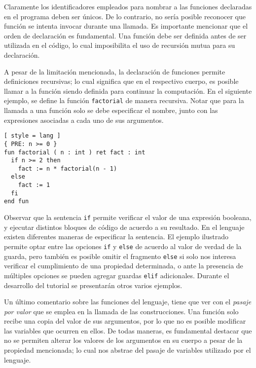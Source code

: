 Claramente los identificadores empleados para nombrar a las funciones declaradas en el programa deben ser únicos.
De lo contrario, no sería posible reconocer que función se intenta invocar durante una llamada.
Es importante mencionar que el orden de declaración es fundamental.
Una función debe ser definida antes de ser utilizada en el código, lo cual imposibilita el uso de recursión mutua para su declaración.

A pesar de la limitación mencionada, la declaración de funciones permite definiciones recursivas; lo cual significa que en el respectivo cuerpo, es posible llamar a la función siendo definida para continuar la computación.
En el siguiente ejemplo, se define la función \lstinline[style = lang]{factorial} de manera recursiva.
Notar que para la llamada a una función solo se debe especificar el nombre, junto con las expresiones asociadas a cada uno de sus argumentos.

\begin{lstlisting}[ style = lang ]
{ PRE: n >= 0 }
fun factorial ( n : int ) ret fact : int
  if n >= 2 then
    fact := n * factorial(n - 1)
  else
    fact := 1
  fi
end fun
\end{lstlisting}

Observar que la sentencia \lstinline[style = lang]{if} permite verificar el valor de una expresión booleana, y ejecutar distintos bloques de código de acuerdo a su resultado.
En el lenguaje existen diferentes maneras de especificar la sentencia.
El ejemplo ilustrado permite optar entre las opciones \lstinline[style = lang]{if} y \lstinline[style = lang]{else} de acuerdo al valor de verdad de la guarda, pero también es posible omitir el fragmento \lstinline[style = lang]{else} si solo nos interesa verificar el cumplimiento de una propiedad determinada, o ante la presencia de múltiples opciones se pueden agregar guardas \lstinline[style = lang]{elif} adicionales.
Durante el desarrollo del tutorial se presentarán otros varios ejemplos.

Un último comentario sobre las funciones del lenguaje, tiene que ver con el \textit{pasaje por valor} que se emplea en la llamada de las construcciones.
Una función solo recibe una copia del valor de sus argumentos, por lo que no es posible modificar las variables que ocurren en ellos.
De todas maneras, es fundamental destacar que no se permiten alterar los valores de los argumentos en su cuerpo a pesar de la propiedad mencionada; lo cual nos abstrae del pasaje de variables utilizado por el lenguaje.
\fi


